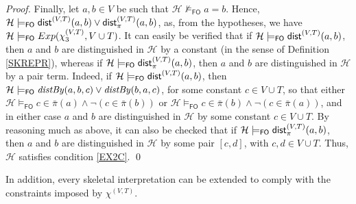 \documentclass[a4paper]{llncs}
\newcommand{\HExp}{Exp}
\newcommand{\pair}[2]{[#1,#2]}
\newcommand{\nonpairin}[2]{#1 \in \bar{\pi}(#2)}
\newcommand{\seteq}[2]{#1=#2}
\newcommand{\consta}{a}
\newcommand{\constb}{b}
\newcommand{\constc}{c}
\newcommand{\hinter}{\ensuremath{\mathcal{H}}}
\newcommand{\fomodels}[2]{#1 \models_{\mathsf{FO}} #2}
\newcommand{\notfomodels}[2]{#1 \not\models_{\mathsf{FO}} #2}
\begin{document}
\begin{proof}
Finally, let $\consta, \constb \in V$ be such that 
$\notfomodels{\hinter}{\seteq{\consta}{\constb}}$. Hence,
$\fomodels{\hinter}{\distS^{(V,T)}(\consta,\constb) \vee 
\distPS^{(V,T)}(\consta,\constb)}$, as, from the hypotheses, we have
$\fomodels{\hinter}{\HExp(\extwof, V \cup T)}$. It can easily be 
verified that if 
$\fomodels{\hinter}{\distS^{(V,T)}(\consta,\constb)}$,
then $\consta$ and $\constb$ are distinguished in $\hinter$ by a 
constant (in the sense of Definition \ref{SKREPR}), whereas if
$\fomodels{\hinter}{\distPS^{(V,T)}(\consta,\constb)}$, then 
$\consta$ and $\constb$ are distinguished in $\hinter$ by a pair term.
Indeed, if $\fomodels{\hinter}{\distS^{(V,T)}(\consta,\constb)}$, 
then $\fomodels{\hinter}{\distby{\consta}{\constb}{\constc} \vee
\distby{\constb}{\consta}{\constc}}$, for some constant $\constc \in 
V \cup T$, so that either 
$\fomodels{\hinter}{\nonpairin{\constc}{\consta} \wedge 
\neg(\nonpairin{\constc}{\constb})}$
or $\fomodels{\hinter}{\nonpairin{\constc}{\constb} 
\wedge\neg(\nonpairin{\constc}{\consta})}$, and in either case 
$\consta$ and
$\constb$ are distinguished in $\hinter$ by some constant $\constc 
\in V \cup T$. By reasoning much as
above, it can also be checked that if 
$\fomodels{\hinter}{\distPS^{(V,T)}(\consta,\constb)}$, then 
$\consta$ and $\constb$ are
distinguished in $\hinter$ by some pair $\pair{\constc}{d}$, with 
$\constc, d \in V \cup T$.
Thus, $\hinter$ satisfies condition \ref{EX2C}. \qed
\end{proof}
%
In addition, every skeletal interpretation can be extended to
comply with the constraints imposed by $\chi^{(V,T)}$.
\end{document}
